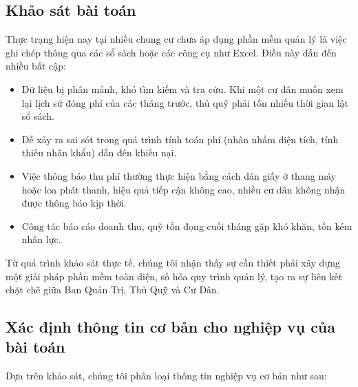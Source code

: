 \documentclass[12pt,a4paper]{article}
\begin{document}
\subsection{Khảo sát bài toán}
Thực trạng hiện nay tại nhiều chung cư chưa áp dụng phần mềm quản lý là việc ghi chép thông qua các sổ sách hoặc các công cụ như Excel. Điều này dẫn đến nhiều bất cập:
\begin{itemize}
    \item Dữ liệu bị phân mảnh, khó tìm kiếm và tra cứu. Khi một cư dân muốn xem lại lịch sử đóng phí của các tháng trước, thủ quỹ phải tốn nhiều thời gian lật sổ sách.
    \item Dễ xảy ra sai sót trong quá trình tính toán phí (nhân nhầm diện tích, tính thiếu nhân khẩu) dẫn đến khiếu nại.
    \item Việc thông báo thu phí thường thực hiện bằng cách dán giấy ở thang máy hoặc loa phát thanh, hiệu quả tiếp cận không cao, nhiều cư dân không nhận được thông báo kịp thời.
    \item Công tác báo cáo doanh thu, quỹ tồn đọng cuối tháng gặp khó khăn, tốn kém nhân lực.
\end{itemize}
Từ quá trình khảo sát thực tế, chúng tôi nhận thấy sự cần thiết phải xây dựng một giải pháp phần mềm toàn diện, số hóa quy trình quản lý, tạo ra sự liên kết chặt chẽ giữa Ban Quản Trị, Thủ Quỹ và Cư Dân.

\subsection{Xác định thông tin cơ bản cho nghiệp vụ của bài toán}
Dựa trên khảo sát, chúng tôi phân loại thông tin nghiệp vụ cơ bản như sau:
\end{document}
